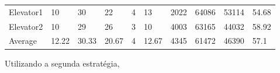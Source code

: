 \documentclass[a4paper]{article}
\begin{document}
\begin{table}[h]
\begin{tabular}{@{}llllllllll@{}}
Elevator1 & 10        & 30            & 22           & 4                                                               & 13                                                                  & 2022                                                         & 64086                                                 & 53114                                                   & 54.68         \\
Elevator2 & 10        & 29            & 26           & 3                                                               & 10                                                                  & 4003                                                         & 63165                                                 & 44032                                                   & 58.92         \\
Average   & 12.22     & 30.33         & 20.67        & 4                                                               & 12.67                                                               & 4345                                                         & 61472                                                 & 46390                                                   & 57.1          \\ \bottomrule
\end{tabular}
\end{table}

\newpage

Utilizando a segunda estratégia,
\end{document}
